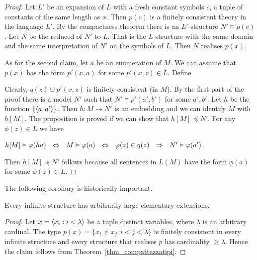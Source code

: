 \documentclass[creche.tex]{subfiles}
\begin{document}
\begin{proof}
 
Let $L'$ be an expansion of $L$ with a fresh constant symbols $c$, a tuple of constants of the same length as $x$. Then $p(c)$ is a finitely consistent theory in the language $L'$. By the compactness theorem there is an $L'$-structure $N'\models p(c)$. Let $N$ be the reduced of $N'$ to $L$. That is the $L$-structure with the same domain and the same interpretation of $N'$ on the symbols of $L$. Then $N$ realises $p(x)$.  

As for the second claim, let $a$ be an enumeration of $M$. We can assume that $p(x)$ has the form $p'(x,a)$ for some $p'(x,z)\in L$. Define


Clearly, $q(z)\cup p'(x,z)$ is finitely consistent (in $M$). By the first part of the proof there is a model $N'$ such that $N'\models p'(a',b')$ for some $a',b'$. Let $h$ be the function $\{\langle a,a'\rangle\}$. Then $h:M\to N'$ is an embedding and we can identify $M$ with $h[M]$. The proposition is proved if we can show that $h[M]\preceq N'$. For any $\phi(z)\in L$ we have


\hfil $h[M]\vDash\varphi(ha)\ \ \Leftrightarrow\ \  M\vDash \varphi(a)\ \  \Leftrightarrow\ \  \varphi(z)\in q(z)\ \   \Rightarrow\ \  N'\vDash \varphi(a')$.

Then $h[M]\preceq N'$ follows because all sentences in $L(M)$ have the form $\phi(a)$ for some $\phi(z)\in L$.
\end{proof}

The following corollary is historically important.

\begin{void_thm}
Every infinite structure has arbitrarily large elementary extensions.
\end{void_thm}

\begin{proof}
Let $x=\langle x_i:i<\lambda\rangle$ be a tuple distinct variables, where $\lambda$ is an arbitrary cardinal. The type $p(x)=\big\{x_i\neq x_j: i<j<\lambda\big\}$ is finitely consistent in every infinite structure and every structure that realises $p$ has cardinality $\ge\lambda$. Hence the claim follows from Theorem~\ref{thm_compattezzatipi}.
\end{proof}
\end{document}
